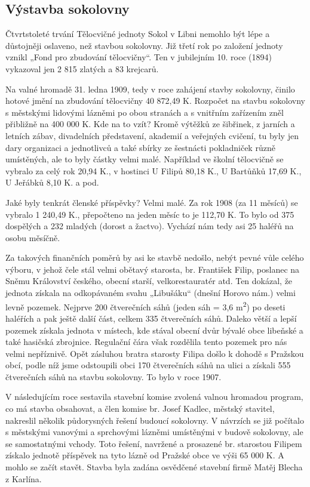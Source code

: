 \subsection{Výstavba sokolovny}\label{vuxfdstavba-sokolovny}

Čtvrtstoleté trvání Tělocvičné jednoty Sokol v Libni nemohlo být lépe a
důstojněji oslaveno, než stavbou sokolovny. Již třetí rok po založení
jednoty vznikl „Fond pro zbudování tělocvičny``. Ten v jubilejním 10.
roce (1894) vykazoval jen 2 815 zlatých a 83 krejcarů.

Na valné hromadě 31. ledna 1909, tedy v roce zahájení stavby sokolovny,
činilo hotové jmění na zbudování tělocvičny 40 872,49 K. Rozpočet na
stavbu sokolovny s městskými lidovými lázněmi po obou stranách a s
vnitřním zařízením zněl přibližně na 400 000 K. Kde na to vzít? Kromě
výtěžků ze šibřinek, z jarních a letních zábav, divadelních představení,
akademií a veřejných cvičení, tu byly jen dary organizaci a jednotlivců
a také sbírky ze šestnácti pokladniček různě umístěných, ale to byly
částky velmi malé. Například ve školní tělocvičně se vybralo za celý rok
20,94 K., v hostinci U Filipů 80,18 K., U Bartůňků 17,69 K., U Jeřábků
8,10 K. a pod.

Jaké byly tenkrát členské příspěvky? Velmi malé. Za rok 1908 (za 11
měsíců) se vybralo 1 240,49 K., přepočteno na jeden měsíc to je 112,70
K. To bylo od 375 dospělých a 232 mladých (dorost a žactvo). Vychází nám
tedy asi 25 haléřů na osobu měsíčně.

Za takových finančních poměrů by asi ke stavbě nedošlo, nebýt pevné vůle
celého výboru, v jehož čele stál velmi obětavý starosta, br. František
Filip, poslanec na Sněmu Království českého, obecní starší,
velkorestauratér atd. Ten dokázal, že jednota získala na odkopávaném
svahu „Libušáku`` (dnešní Horovo nám.) velmi levně pozemek. Nejprve 200
čtverečních sáhů (jeden sáh = 3,6 m\textsuperscript{2}) po deseti
haléřích a pak ještě další část, celkem 335 čtverečních sáhů. Daleko
větší a lepší pozemek získala jednota v místech, kde stával obecní dvůr
bývalé obce libeňské a také hasičská zbrojnice. Regulační čára však
rozdělila tento pozemek pro nás velmi nepříznivě. Opět zásluhou bratra
starosty Filipa došlo k dohodě s Pražskou obcí, podle níž jsme
odstoupili obci 170 čtverečních sáhů na ulici a získali 555 čtverečních
sáhů na stavbu sokolovny. To bylo v roce 1907.

V následujícím roce sestavila stavební komise zvolená valnou hromadou
program, co má stavba obsahovat, a člen komise br. Josef Kadlec, městský
stavitel, nakreslil několik půdorysných řešení budoucí sokolovny. V
návrzích se již počítalo s městskými vanovými a sprchovými lázněmi
umístěnými v budově sokolovny, ale se samostatnými vchody. Toto řešení,
navržené a prosazené br. starostou Filipem získalo jednotě příspěvek na
tyto lázně od Pražské obce ve výši 65 000 K. A mohlo se začít stavět.
Stavba byla zadána osvědčené stavební firmě Matěj Blecha z Karlína.

